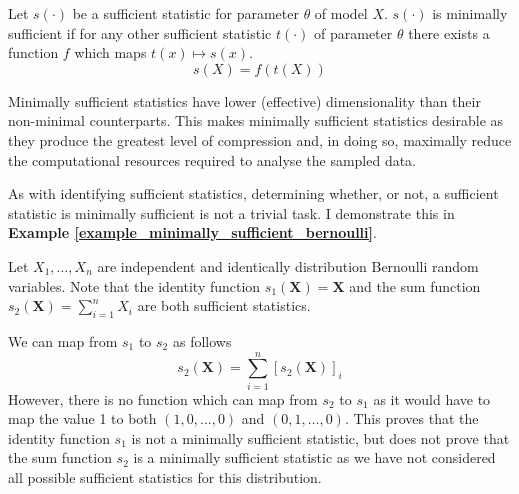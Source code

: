 \documentclass[bibliography=totoc,11pt,a4paper,margin=0]{article}
\theoremstyle{break}
\begin{document}
  \begin{box_definition}\label{def_minimally_sufficient_statistic}
    Let $s(\cdot)$ be a sufficient statistic for parameter $\theta$ of model $X$. $s(\cdot)$ is minimally sufficient if for any other sufficient statistic $t(\cdot)$ of parameter $\theta$ there exists a function $f$ which maps $t(x)\mapsto s(x)$.
    \[ s(X)=f(t(X)) \]
  \end{box_definition}

  \par Minimally sufficient statistics have lower (effective) dimensionality than their non-minimal counterparts. This makes minimally sufficient statistics desirable as they produce the greatest level of compression and, in doing so, maximally reduce the computational resources required to analyse the sampled data.

  \par As with identifying sufficient statistics, determining whether, or not, a sufficient statistic is minimally sufficient is not a trivial task. I demonstrate this in \textbf{Example \ref{example_minimally_sufficient_bernoulli}}.

  \begin{box_example}\label{example_minimally_sufficient_bernoulli}
    Let $X_1,\dots,X_n$ are independent and identically distribution Bernoulli random variables. Note that the identity function $s_1(\mathbf{X})=\mathbf{X}$ and the sum function $s_2(\mathbf{X})=\sum_{i=1}^nX_i$ are both sufficient statistics.
    \par We can map from $s_1$ to $s_2$ as follows
    \[ s_2(\mathbf{X})=\sum_{i=1}^n [s_2(\mathbf{X})]_i \]
    However, there is no function which can map from $s_2$ to $s_1$ as it would have to map the value 1 to both $(1,0,\dots,0)$ and $(0,1,\dots,0)$. This proves that the identity function $s_1$ is not a minimally sufficient statistic, but does not prove that the sum function $s_2$ is a minimally sufficient statistic as we have not considered all possible sufficient statistics for this distribution.
  \end{box_example}
\end{document}
